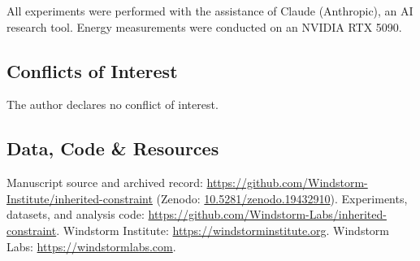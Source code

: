 \documentclass[11pt]{article}
\begin{document}
All experiments were performed with the assistance of Claude (Anthropic), an AI research tool. Energy measurements were conducted on an NVIDIA RTX 5090.

\subsection*{Conflicts of Interest}

The author declares no conflict of interest.

\subsection*{Data, Code \& Resources}
\noindent Manuscript source and archived record: \url{https://github.com/Windstorm-Institute/inherited-constraint} (Zenodo: \href{https://doi.org/10.5281/zenodo.19432910}{10.5281/zenodo.19432910}). Experiments, datasets, and analysis code: \url{https://github.com/Windstorm-Labs/inherited-constraint}. Windstorm Institute: \url{https://windstorminstitute.org}. Windstorm Labs: \url{https://windstormlabs.com}.
\end{document}
